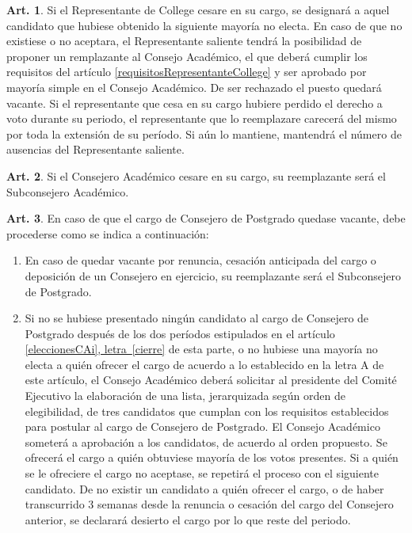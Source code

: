 \documentclass[letterpaper,11pt]{article}
\theoremstyle{definition}%
\newtheorem{art}{Art.} %
\newcommand{\aaref}[2]{\hyperref[#2]{\ref*{#1}, letra~\ref*{#2}}}
\begin{document}
\begin{art}
	Si el Representante de College cesare en su cargo, se designará a aquel candidato que hubiese obtenido la siguiente mayoría no electa. En caso de que no existiese o no aceptara, el Representante saliente tendrá la posibilidad de proponer un remplazante al Consejo Académico, el que deberá cumplir los requisitos del artículo \ref{requisitosRepresentanteCollege} y ser aprobado por mayoría simple en el Consejo Académico. De ser rechazado el puesto quedará vacante. Si el representante que cesa en su cargo hubiere perdido el derecho a voto durante su periodo, el representante que lo reemplazare carecerá del mismo por toda la extensión de su período. Si aún lo mantiene, mantendrá el número de ausencias del Representante saliente.
\end{art}

\begin{art}\label{reemplazoCA}
	Si el Consejero Académico cesare en su cargo, su reemplazante será el Subconsejero Académico.
\end{art}

\begin{art} \label{eleccionExtraordinariaCAPostgrado}
	En caso de que el cargo de Consejero de Postgrado quedase vacante, debe procederse como se indica a continuación:
	\begin{enumerate}
		\item\label{cp_renuncia} En caso de quedar vacante por renuncia, cesación anticipada del cargo o deposición de un Consejero en ejercicio, su reemplazante será el Subconsejero de Postgrado.

		\item Si no se hubiese presentado ningún candidato al cargo de Consejero de Postgrado después de los dos períodos estipulados en el artículo \aaref{eleccionesCAi}{cierre} de esta parte, o no hubiese una mayoría no electa a quién ofrecer el cargo de acuerdo a lo establecido en la letra A de este artículo, el Consejo Académico deberá solicitar al presidente del Comité Ejecutivo la elaboración de una lista, jerarquizada según orden de elegibilidad, de tres candidatos que cumplan con los requisitos establecidos para postular al cargo de Consejero de Postgrado. El Consejo Académico someterá a aprobación a los candidatos, de acuerdo al orden propuesto. Se ofrecerá el cargo a quién obtuviese mayoría de los votos presentes. Si a quién se le ofreciere el cargo no aceptase, se repetirá el proceso con el siguiente candidato. De no existir un candidato a quién ofrecer el cargo, o de haber transcurrido 3 semanas desde la renuncia o cesación del cargo del Consejero anterior, se declarará desierto el cargo por lo que reste del periodo.
	\end{enumerate}
\end{art}
\end{document}
